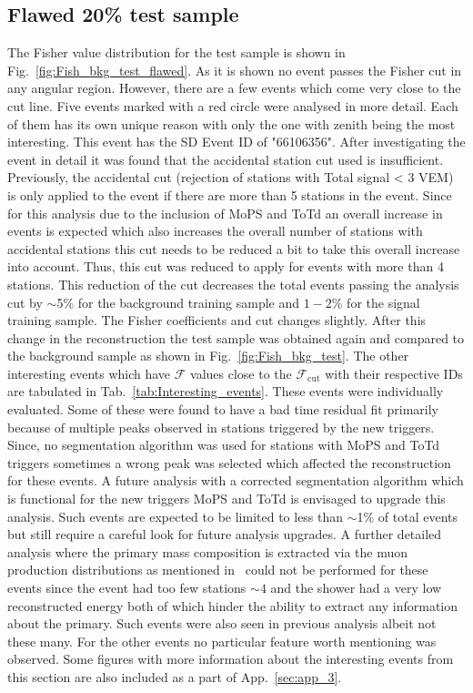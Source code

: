 \subsection{Flawed 20\% test sample}
\label{subsec:unblind_20}

The Fisher value distribution for the test sample is shown in Fig.~\ref{fig:Fish_bkg_test_flawed}. As it is shown no event passes the Fisher cut in any angular region. However, there are a few events which come very close to the cut line. Five events marked with a red circle were analysed in more detail. Each of them has its own unique reason with only the one with zenith being the most interesting. This event has the SD Event ID of "66106356". After investigating the event in detail it was found that the accidental station cut used is insufficient. Previously, the  accidental cut (rejection of stations with Total signal < 3 VEM) is only applied to the event if there are more than 5 stations in the event. Since for this analysis due to the inclusion of MoPS and ToTd an overall increase in events is expected which also increases the overall number of stations with accidental stations this cut needs to be reduced a bit to take this overall increase into account. Thus, this cut was reduced to apply for events with more than 4 stations. This reduction of the cut decreases the total events passing the analysis cut by $\sim$5\% for the background training sample and $1-2$\% for the signal training sample. The Fisher coefficients and cut changes slightly. After this change in the reconstruction the test sample was obtained again and compared to the background sample as shown in Fig.~\ref{fig:Fish_bkg_test}. The other interesting events which have $\mathcal{F}$ values close to the $\mathcal{F}_{\text{cut}}$ with their respective IDs are tabulated in Tab.~\ref{tab:Interesting_events}. These events were individually evaluated. Some of these were found to have a bad time residual fit primarily because of multiple peaks observed in stations triggered by the new triggers. Since, no segmentation algorithm was used for stations with MoPS and ToTd triggers sometimes a wrong peak was selected which affected the reconstruction for these events. A future analysis with a corrected segmentation algorithm which is functional for the new triggers MoPS and ToTd is envisaged to upgrade this analysis. Such events are expected to be limited to less than $\sim$1\% of total events but still require a careful look for future analysis upgrades. A further detailed analysis where the primary mass composition is extracted via the muon production distributions as mentioned in~\cite{PierreAuger:2014zay} could not be performed for these events since the event had too few stations $\sim 4$ and the shower had a very low reconstructed energy both of which hinder the ability to extract any information about the primary. Such events were also seen in previous analysis albeit not these many. For the other events no particular feature worth mentioning was observed. Some figures with more information about the interesting events from this section are also included as a part of App.~\ref{sec:app_3}. 



